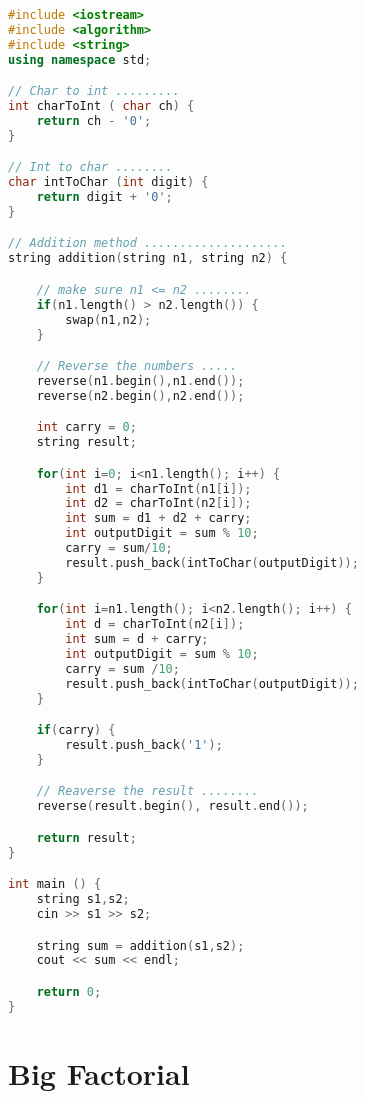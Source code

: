 \setlength{\columnsep}{1 cm}
\begin{multicols}{2}
\begin{lstlisting}[language=c++]
#include <iostream>
#include <algorithm>
#include <string>
using namespace std;

// Char to int .........
int charToInt ( char ch) {
    return ch - '0';
}

// Int to char ........
char intToChar (int digit) {
    return digit + '0';
}

// Addition method ....................
string addition(string n1, string n2) {

    // make sure n1 <= n2 ........
    if(n1.length() > n2.length()) {
        swap(n1,n2);
    }

    // Reverse the numbers .....
    reverse(n1.begin(),n1.end());
    reverse(n2.begin(),n2.end());

    int carry = 0;
    string result;

    for(int i=0; i<n1.length(); i++) {
        int d1 = charToInt(n1[i]);
        int d2 = charToInt(n2[i]);
        int sum = d1 + d2 + carry;
        int outputDigit = sum % 10;
        carry = sum/10;
        result.push_back(intToChar(outputDigit));
    }

    for(int i=n1.length(); i<n2.length(); i++) {
        int d = charToInt(n2[i]);
        int sum = d + carry;
        int outputDigit = sum % 10;
        carry = sum /10;
        result.push_back(intToChar(outputDigit));
    }

    if(carry) {
        result.push_back('1');
    }

    // Reaverse the result ........
    reverse(result.begin(), result.end());

    return result;
}

int main () {
    string s1,s2;
    cin >> s1 >> s2;

    string sum = addition(s1,s2);
    cout << sum << endl;

    return 0;
}
\end{lstlisting}

\end{multicols}


\newpage
\section{Big Factorial}

